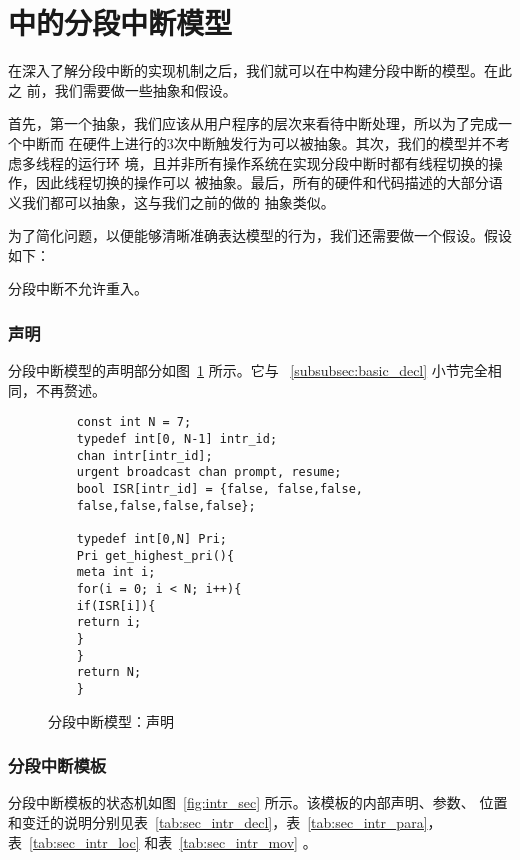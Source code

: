 \section{\uppaal 中的分段中断模型}
\label{subsec:segment_uppaal}

在深入了解分段中断的实现机制之后，我们就可以在\uppaal 中构建分段中断的模型。在此之
前，我们需要做一些抽象和假设。

首先，第一个抽象，我们应该从用户程序的层次来看待中断处理，所以为了完成一个中断而
在硬件上进行的3次中断触发行为可以被抽象。其次，我们的模型并不考虑多线程的运行环
境，且并非所有操作系统在实现分段中断时都有线程切换的操作，因此线程切换的操作可以
被抽象。最后，所有的硬件和代码描述的大部分语义我们都可以抽象，这与我们之前的做的
抽象类似。

为了简化问题，以便\uppaal 能够清晰准确表达模型的行为，我们还需要做一个假设。假设
如下：

\begin{assumption}
	分段中断不允许重入。
\end{assumption}

\subsubsection{声明}
\label{subsubsec:segment_decl}

分段中断模型的声明部分如图~\ref{fig:sec_decl} 所示。它与
~\ref{subsubsec:basic_decl} 小节完全相同，不再赘述。

\begin{figure}[H]
	\centering
	\begin{lstlisting}
	const int N = 7;
	typedef int[0, N-1] intr_id; 
	chan intr[intr_id];
	urgent broadcast chan prompt, resume;
	bool ISR[intr_id] = {false, false,false,
	false,false,false,false};
	
	typedef int[0,N] Pri;
	Pri get_highest_pri(){
	meta int i;
	for(i = 0; i < N; i++){
	if(ISR[i]){
	return i;
	} 
	}
	return N;
	}
	\end{lstlisting}
	\caption{分段中断模型：声明}
	\label{fig:sec_decl}
\end{figure}

\subsubsection{分段中断模板}
\label{subsubsec:segment_intr}

分段中断模板的状态机如图~\ref{fig:intr_sec} 所示。该模板的内部声明、参数、
位置和变迁的说明分别见表~\ref{tab:sec_intr_decl}，表~\ref{tab:sec_intr_para}，
表~\ref{tab:sec_intr_loc} 和表~\ref{tab:sec_intr_mov} 。


